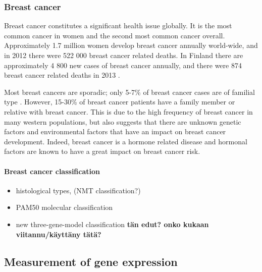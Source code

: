 \subsubsection{Breast cancer}\label{breast-cancer}

Breast cancer constitutes a significant health issue globally. It is the most
common cancer in women and the second most common cancer overall.
Approximately 1.7 million women develop breast cancer annually world-wide, and
in 2012 there were 522 000 breast cancer related deaths.
\citep{Ferlay2015} In Finland there are approximately 4 800 new cases of
breast cancer annually, and there were 874 breast cancer related deaths in
2013 \citep{Syoparekisteri}.

Most breast cancers are sporadic; only 5-7\% of breast cancer cases are of
familial type \citep{Melchor2013}. However, 15-30\% of breast cancer patients
have a family member or relative with breast cancer. This is due to the high
frequency of breast cancer in many western populations, but also suggests that
there are unknown genetic factors and environmental factors that have an
impact on breast cancer development.  Indeed, breast cancer is a hormone
related disease and hormonal factors are known to have a great impact on
breast cancer risk.


\paragraph{Breast cancer classification}\label{breast-cancer-classification}

\begin{itemize}
\tightlist
\item
  histological types, (NMT classification?)
\item
  PAM50 molecular classification
\item
  new three-gene-model classification \textbf{tän edut? onko kukaan viitannu/käyttäny tätä?}
\end{itemize}










\subsection{Measurement of gene expression}\label{measurement-of-gene-expression}

